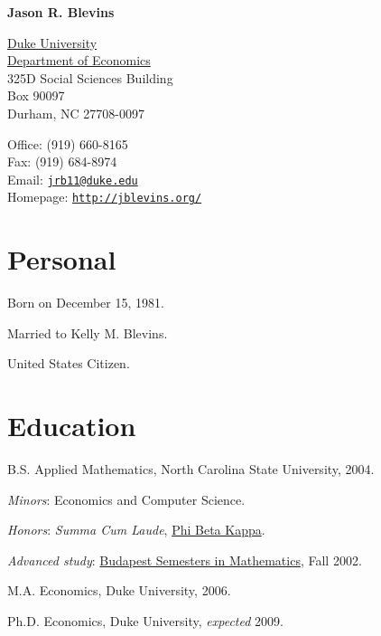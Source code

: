 \documentclass[letterpaper]{article}
\renewenvironment{itemize}{
  \begin{list}{}{
    \setlength{\leftmargin}{1em}
  }
}{
  \end{list}
}
\begin{document}
{\huge\bf Jason R. Blevins}

\vspace{0.25in}

\begin{minipage}{0.5\textwidth}
  \href{http://www.duke.edu/}{Duke University} \\
  \href{http://www.econ.duke.edu/}{Department of Economics} \\
  325D Social Sciences Building \\
  Box 90097 \\
  Durham, NC 27708-0097
\end{minipage}
\begin{minipage}{0.5\textwidth}
  Office: (919) 660-8165 \\
  Fax: (919) 684-8974 \\
  Email: \href{mailto:jrb11@duke.edu}{\tt jrb11@duke.edu} \\
  Homepage: \href{http://jblevins.org/}{\tt http://jblevins.org/} \\
\end{minipage}

\section*{Personal}

\begin{itemize}
\item Born on December 15, 1981.
\item Married to Kelly M. Blevins.
\item United States Citizen.
\end{itemize}


\section*{Education}

\begin{itemize}
  \item B.S. Applied Mathematics, North Carolina State University, 2004.
    \begin{itemize}
    \item \textit{Minors}: Economics and Computer Science.
    \item \textit{Honors}: \textit{Summa Cum Laude},
      \href{http://www.pbk.org/}{Phi Beta Kappa}.
    \item \textit{Advanced study}:
      \href{http://www.stolaf.edu/depts/math-old/budapest/}{Budapest
        Semesters in Mathematics}, Fall 2002.
    \end{itemize}

  \item M.A. Economics, Duke University, 2006.

  \item Ph.D. Economics, Duke University, \textit{expected} 2009.
\end{itemize}
\end{document}
